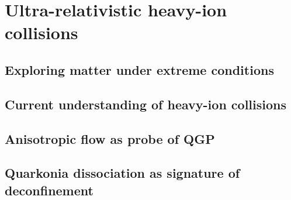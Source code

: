 \chapter{Ultra-relativistic heavy-ion collisions}


\minitoc

\section{Exploring matter under extreme conditions}

\lipsum[2-4]

\section{Current understanding of heavy-ion collisions}

\lipsum[4-6]

\section{Anisotropic flow as probe of QGP}

\lipsum[8-10]

\section{Quarkonia dissociation as signature of deconfinement}


\lipsum[2-10]



